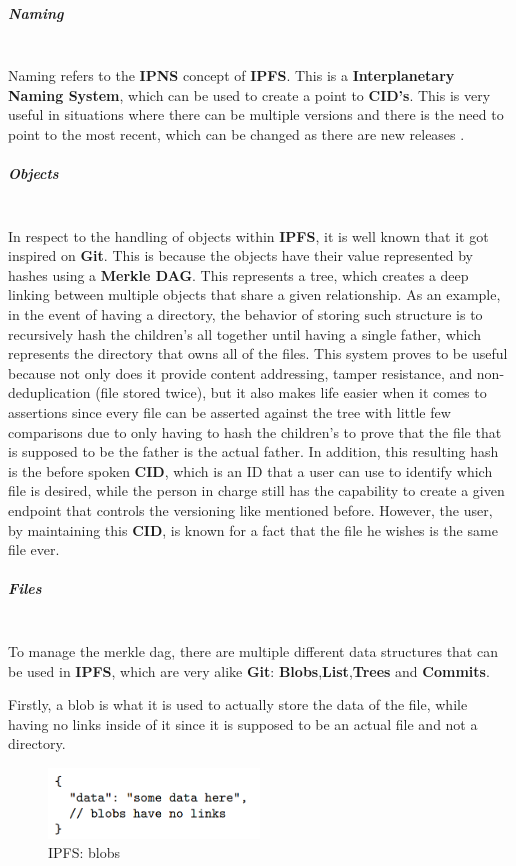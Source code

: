 \subparagraph{Naming}  \mbox{} \\
Naming refers to the \textbf{IPNS} concept of \textbf{IPFS}. This is a \textbf{Interplanetary Naming System}, which can be used to create a point to \textbf{CID's}. This is very useful in situations where there can be multiple versions and there is the need to point to the most recent, which can be changed as there are new releases \cite{ipns}.

\subparagraph{Objects}  \mbox{} \\
In respect to the handling of objects within \textbf{IPFS}, it is well known that it got inspired on \textbf{Git}. This is because the objects have their value represented by hashes using a \textbf{Merkle DAG}. This represents a tree, which creates a deep linking between multiple objects that share a given relationship. As an example, in the event of having a directory, the behavior of storing such structure is to recursively hash the children's all together until having a single father, which represents the directory that owns all of the files. This system proves to be useful because not only does it provide content addressing, tamper resistance, and non-deduplication (file stored twice), but it also makes life easier when it comes to assertions since every file can be asserted against the tree with little few comparisons due to only having to hash the children's to prove that the file that is supposed to be the father is the actual father. In addition, this resulting hash is the before spoken \textbf{CID}, which is an ID that a user can use to identify which file is desired, while the person in charge still has the capability to create a given endpoint that controls the versioning like mentioned before. However, the user, by maintaining this \textbf{CID}, is known for a fact that the file he wishes is the same file ever.

\subparagraph{Files}  \mbox{} \\
To manage the merkle dag, there are multiple different data structures that can be used in \textbf{IPFS}, which are very alike \textbf{Git}: \textbf{Blobs},\textbf{List},\textbf{Trees} and \textbf{Commits}. 

Firstly, a blob is what it is used to actually store the data of the file, while having no links inside of it since it is supposed to be an actual file and not a directory.

\begin{figure}[H]
    \centering
    \includegraphics[width=0.5\textwidth]{assets/use-case-1/blobs.png} %
    \caption{IPFS: blobs}
    \label{fig:sample-image} 
\end{figure}

